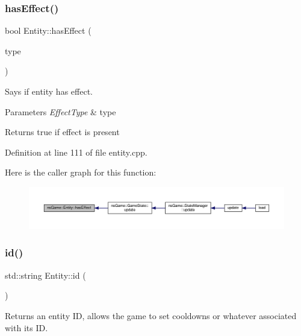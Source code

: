\subsubsection{\texorpdfstring{has\+Effect()}{hasEffect()}}
{\footnotesize\ttfamily bool Entity\+::has\+Effect (\begin{DoxyParamCaption}\item[{\hyperlink{namespacens_game_afea521dd2ba8e97be9549ce9936f4522}{Effect\+Type}}]{type }\end{DoxyParamCaption})}



Says if entity has effect. 


\begin{DoxyParams}{Parameters}
{\em Effect\+Type} & type \\
\hline
\end{DoxyParams}
\begin{DoxyReturn}{Returns}
true if effect is present 
\end{DoxyReturn}


Definition at line 111 of file entity.\+cpp.

Here is the caller graph for this function\+:\nopagebreak
\begin{figure}[H]
\begin{center}
\leavevmode
\includegraphics[width=350pt]{structns_game_1_1_entity_af5bf634702f96ed5daac8130a3dee4f0_icgraph}
\end{center}
\end{figure}
\mbox{\label{structns_game_1_1_entity_aa0057e4e5b73cc0187602c3180347a3a}} 
\subsubsection{\texorpdfstring{id()}{id()}}
{\footnotesize\ttfamily std\+::string Entity\+::id (\begin{DoxyParamCaption}{ }\end{DoxyParamCaption})}



Returns an entity ID, allows the game to set cooldowns or whatever associated with its ID. 

